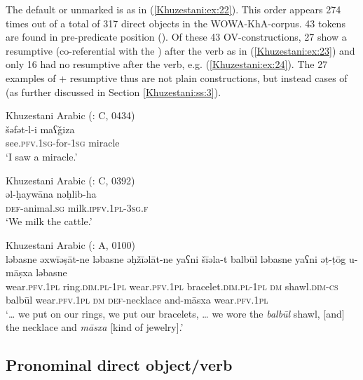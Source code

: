 \documentclass[output=paper,colorlinks,citecolor=brown,draftmode]{langscibook}
\begin{document}
The default or unmarked  is  as in (\ref{Khuzestani:ex:22}). This order appears 274 times out of a total of 317 direct objects in the WOWA-KhA-corpus. 43 tokens are found in pre-predicate position (). Of these 43 OV-constructions, 27 show a resumptive  (co-referential with the ) after the verb as in (\ref{Khuzestani:ex:23}) and only 16 had no resumptive  after the verb, e.g. (\ref{Khuzestani:ex:24}). The 27 examples of  + resumptive  thus are not plain  constructions, but instead cases of  (as further discussed in Section \ref{Khuzestani:ss:3}). 

\ea\label{Khuzestani:ex:22}
Khuzestani Arabic (\citealt{leitnerArabic2021}: C, 0434) \\
\gll šəfət-l-i maʕǧiza \\
see\textsc{.pfv.1sg}-for-\textsc{1sg} miracle \\
\glt `I saw a miracle.' 
\z

\ea\label{Khuzestani:ex:23}
Khuzestani Arabic (\citealt{leitnerArabic2021}: C, 0392) \\
\gll əl-ḥaywāna nəḥlib-ha \\
\textsc{def-}animal\textsc{.sg} milk\textsc{.ipfv.1pl-3sg.f} \\
\glt `We milk the cattle.' 
\z

\ea\label{Khuzestani:ex:24}
Khuzestani Arabic (\citealt{leitnerArabic2021}: A, 0100) \\
\gll ləbasne əxwīəṣāt-ne ləbasne əḥžīəlāt-ne yaʕni šīəla-t balbūl ləbasne yaʕni əṭ-ṭōg u-māṣxa ləbasne \\
wear\textsc{.pfv.1pl} ring\textsc{.dim.pl-1pl} wear\textsc{.pfv.1pl} bracelet\textsc{.dim.pl-1pl} \textsc{dm} shawl\textsc{.dim-cs} balbūl wear\textsc{.pfv.1pl} \textsc{dm} \textsc{def-}necklace and-māsxa wear\textsc{.pfv.1pl} \\
\glt `… we put on our rings, we put our bracelets, … we wore the \textit{balbūl} shawl{\footnotemark}, [and] the necklace and \textit{māsxa} [kind of jewelry].' 
\z


\subsection{Pronominal direct object/verb }\label{Khuzestani:ss:2.9}
\end{document}
